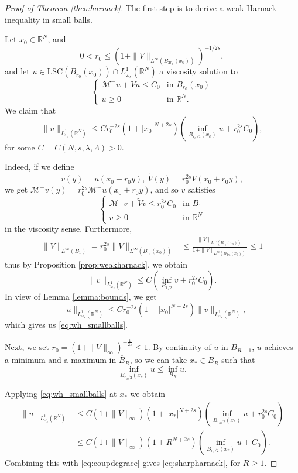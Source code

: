 \documentclass[10pt,a4paper]{amsart}
\newcommand{\Lomega}{L_{\omega_s}^1(\R^N)}
\newcommand{\M}{\mathcal{M}}
\newcommand{\R}{\mathbb{R}}
\newcommand{\lsc}{\text{LSC}}
\begin{document}
\begin{proof}[Proof of Theorem \ref{theo:harnack}]
	The first step is to derive a weak Harnack inequality in small balls.

Let $x_0 \in \R^N$, and
\begin{equation}
\label{eq:r0}
0 < r_0 \leq (1 + \|V\|_{L^{\infty}(B_{2r_0}(x_0))})^{-1/2s},
\end{equation}
and let $u \in \lsc(B_{r_0}(x_0)) \cap \Lomega$ a viscosity solution to 
\[\begin{cases}
\M^-u + Vu \leq C_0 & \text{in }B_{r_0}(x_0) \\
u\geq 0 & \text{in } \R^N. 
\end{cases}\]
We claim that
\begin{equation}
\label{eq:wh_smallballs}
\|u\|_{\Lomega} \leq C r_0^{-2s} (1+|x_0|^{N+2s}) \left(\inf_{B_{r_0/2} (x_0)}u + r_0^{2s}C_0 \right),
\end{equation}
for some $C=C(N,s,\lambda,\Lambda)>0$.

Indeed, if we define 
\begin{equation}
\label{eq:v}
v(y) = u(x_0 + r_0y),~\tilde{V}(y) = r_0^{2s}V(x_0+r_0 y),
\end{equation} 
we get $\M^-v(y) = r_0^{2s}\M^-u(x_0 +r_0y)$, and so $v$ satisfies  
\[\begin{cases}
\M^-v + \tilde{V}v \leq r_0^{2s}C_0 & \text{in }B_1 \\
v\geq 0 & \text{in } \R^N
\end{cases}\]
in the viscosity sense. Furthermore, 
\begin{align*}
\|\tilde{V}\|_{L^{\infty}(B_1)} =r_0^{2s} \|V\|_{L^{\infty}(B_{r_0}(x_0))} &\leq \frac{\|V\|_{L^{\infty}(B_{r_0}(x_0))}}{1 + \|V\|_{L^{\infty}(B_{2r_0}(x_0))}} \leq 1
\end{align*}
thus by Proposition \ref{prop:weakharnack}, we obtain 
\[\|v\|_{\Lomega}\leq C(\inf_{B_{1/2}}v + r_0^{2s}C_0). \]
In view of Lemma \ref{lemma:bounds}, we get 
\[\|u\|_{\Lomega} \leq C r_0^{-2s} (1 + |x_0|^{N+2s})   \|v\|_{\Lomega} ,
 \]
which gives us \eqref{eq:wh_smallballs}.

\smallskip

Next, we set $r_0 = (1 + \|V\|_{\infty})^{-\frac{1}{2s}} \leq 1$. 
By continuity of $u$ in $B_{R+1}$, $u$ achieves a minimum and a maximum in $\overline{B}_R$, so we can take $x_*\in {B}_R$ such that
\begin{equation}
\label{eq:coupdegrace}
\inf_{B_{r_0/2}(x_*)}u \leq  \inf_{B_R}u .
\end{equation}

Applying \eqref{eq:wh_smallballs} at $x_*$ we obtain
\begin{align*}
\|u\|_{\Lomega} & \leq C(1 + \|V\|_{\infty}) (1+|x_*|^{N+2s})\left(\inf_{B_{r_0/2} (x_*)}u  + r_0^{2s}C_0\right) \\
&  \leq C(1 + \|V\|_{\infty})  (1 + R^{N+2s})\left(\inf_{B_{r_0/2} (x_*)}u + C_0\right).
\end{align*}
Combining this with \eqref{eq:coupdegrace} gives \eqref{eq:sharpharnack}, for  $R\geq 1$.
\end{proof}
\end{document}
